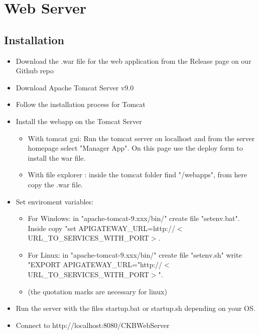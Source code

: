 \section{Web Server}
\subsection{Installation}
\begin{itemize}
    \item Download the .war file for the web application from the Release page on our Github repo
    \item Download Apache Tomcat Server v9.0
    \item Follow the installation process for Tomcat
    \item Install the webapp on the Tomcat Server
    \begin{itemize}
        \item With tomcat gui: Run the tomcat server on localhost and from the server homepage select "Manager App". On this page use the deploy form to install the war file.
        \item With file explorer : inside the tomcat folder find "/webapps", from here copy the .war file.
    \end{itemize}
    \item Set enviroment variables: 
    \begin{itemize}
        \item For Windows: in "apache-tomcat-9.xxx/bin/" create file "setenv.bat". Inside copy "set APIGATEWAY\_URL=http://$<$URL\_TO\_SERVICES\_WITH\_PORT$>$.
        \item For Linux: in "apache-tomcat-9.xxx/bin/" create file "setenv.sh" write "EXPORT APIGATEWAY\_URL="http://$<$URL\_TO\_SERVICES\_WITH\_PORT$>$".
        \item (the quotation marks are necessary for linux)
    \end{itemize} 
    \item Run the server with the files startup.bat or startup.sh depending on your OS.
    \item Connect to http://localhost:8080/CKBWebServer
\end{itemize}


